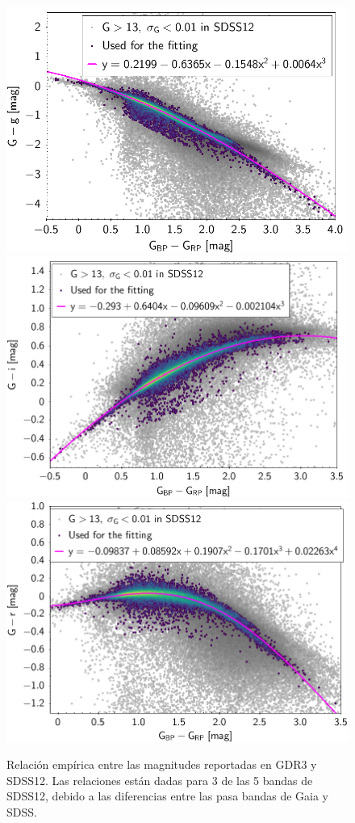 \begin{figure}[!ht]
	\centering
	\includegraphics[scale=0.18]{Muestra/Secciones/Figures/Gaia-SDSS-Transform-g.png}
	\includegraphics[scale=0.18]{Muestra/Secciones/Figures/Gaia-SDSS-Transform-i.png}
	\includegraphics[scale=0.18]{Muestra/Secciones/Figures/Gaia-SDSS-Transform-r.png}

	\caption{Relación empírica entre las magnitudes reportadas en GDR3 y SDSS12. Las relaciones están dadas para 3 de las 5 bandas de SDSS12, debido a las diferencias entre las pasa bandas de Gaia y SDSS. \citet{gdr3ReleaseDocumentation}}
	\label{gdr3SdssConversionGraphs}
\end{figure}

